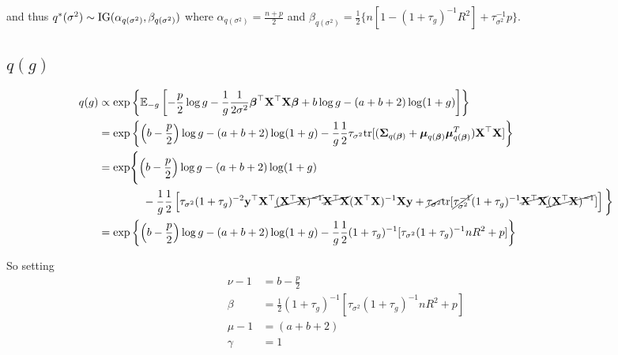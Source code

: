 \documentclass{amsart}[12pt]
\begin{document}
and thus $q^*(\sigma^2) \sim \text{IG}(\alpha_{q(\sigma^2)}, \beta_{q(\sigma^2)})$ where
$\alpha_{q(\sigma^2)} = \frac{n + p}{2}$ and $\beta_{q(\sigma^2)} = \frac{1}{2} \{n[1 - (1 + \tau_g)^{-1}  R^2] + \tau_{\sigma^2}^{-1} p \}$.

\subsection{$q(g)$}
\begin{align*}
	q(g) & \propto \exp \left\{ \mathbb{E}_{-g} \left[-\frac{p}{2} \log g - \frac{1}{g} \frac{1}{2 \sigma^2} {\boldsymbol \beta}^\top {\bf X}^\top {\bf X} {\boldsymbol\beta} + b \log g - (a + b + 2) \log(1 + g) \right] \right\}                                                                                                                                                               \\
	     & = \exp \left \{ \left(b - \frac{p}{2}\right) \log g  - (a + b + 2) \log(1 + g) - \frac{1}{g} \frac{1}{2} \tau_{\sigma^2} \text{tr}[({\boldsymbol \Sigma}_{q({\boldsymbol \beta})} + {\boldsymbol \mu}_{q({\boldsymbol \beta})} {\boldsymbol \mu}_{q({\boldsymbol \beta})}^T) {\bf X}^\top {\bf X}] \right \}                                                                                                                              \\
	     & = \exp \Biggl \{ \left(b - \frac{p}{2}\right) \log g - (a + b + 2) \log(1 + g)                                                                                                                                                                                                                                                                \\
	     & \quad \quad \qquad  - \frac{1}{g} \frac{1}{2} \left[\tau_{\sigma^2} (1 + \tau_g)^{-2} {\bf y}^\top {\bf X}^\top \cancel{({\bf X}^\top {\bf X})^{-1}} \cancel{{\bf X}^\top {\bf X}} ({\bf X}^\top {\bf X})^{-1} {\bf X} {\bf y} + \cancel{\tau_{\sigma^2}} \text{tr}{[\cancel{\tau_{\sigma^2}^{-1}} (1 + \tau_g)^{-1} \cancel{{\bf X}^\top {\bf X}} \cancel{({\bf X}^\top {\bf X})^{-1}}]} \right]	\biggl \} \\
	     & = \exp \left \{ \left(b - \frac{p}{2}\right) \log g - (a + b + 2) \log(1 + g) - \frac{1}{g} \frac{1}{2} (1 + \tau_g)^{-1} [\tau_{\sigma^2} (1 + \tau_g)^{-1} n R^2 + p]                                                                                                                                                                       
	\right \}
\end{align*}

So setting
\begin{align*}
	\nu - 1 & = b - \frac{p}{2}                                                             \\
	\beta   & = \frac{1}{2} (1 + \tau_g)^{-1} [\tau_{\sigma^2} (1 + \tau_g)^{-1} n R^2 + p] \\
	\mu - 1 & = (a + b + 2)                                                                 \\
	\gamma  & = 1                                                                           
\end{align*}
\end{document}
